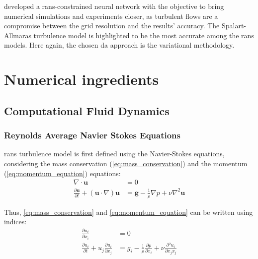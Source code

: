 \documentclass[12pt,twoside]{report}
\renewcommand \pd[2] { \frac{\partial {#1} } {\partial {#2}} }
\newcommand{\Autorefs}[1]{%
  \begingroup%
    \def\chapterautorefname{Chapters}%
    \def\figureautorefname{Figures}%
    \def\sectionautorefname{Sections}%
    \def\subsectionautorefname{Subsections}%
    \def\subsubsectionautorefname{Subsubsections}%
    \def\paragraphautorefname{Paragraphs}%
    \def\tableautorefname{Tables}%
    \def\equationautorefname{Equations}%
    \def\algorithmautorefname{Algorithms}%
    \def\lineautorefname{Lines}%
  \autoref{#1}%
  \endgroup%
}
\begin{document}
\cite{mons_2023_da} developed a \gls{rans}-constrained neural network with the objective to bring numerical simulations and experiments closer, as turbulent flows are a compromise between the grid resolution and the results' accuracy. The Spalart-Allmaras turbulence model is highlighted to be the most accurate among the \gls{rans} models. Here again, the chosen \gls{da} approach is the variational methodology. 


\clearpage

\chapter{Numerical ingredients}
\minitoc

\clearpage

\section{Computational Fluid Dynamics}

\subsection{Reynolds Average Navier Stokes Equations}

\gls{rans} turbulence model is first defined using the Navier-Stokes equations, considering the mass conservation (\autoref{eq:mass_conservation}) and the momentum (\autoref{eq:momentum_equation}) equations:
\begin{align}
    \nabla \cdot \mathbf{u} &= 0 \label{eq:mass_conservation} \\
    \frac{\partial \mathbf{u}}{\partial t} + \left( \mathbf{u} \cdot \nabla \right) \mathbf{u} &= \mathbf{g} - \frac{1}{\rho} \nabla p + \nu \nabla^2 \mathbf{u} \label{eq:momentum_equation}
\end{align}

Thus, \Autorefs{eq:mass_conservation} and \ref{eq:momentum_equation} can be written using indices:
\begin{align}
    \pd{u_i}{x_i} &= 0 \label{eq:mass_conservation_idx} \\
    \pd{u_i}{t} + u_j \pd{u_i}{x_j}  &= g_i - \frac{1}{\rho} \pd{p}{x_i} + \nu \pd{^2 u_i}{x_j x_j} \label{eq:momentum_equation_idx}
\end{align}
\end{document}
